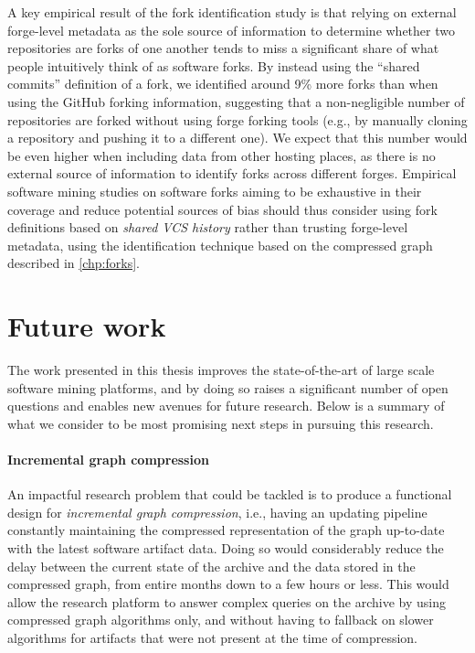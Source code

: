 A key empirical result of the fork identification study is that relying on
external forge-level metadata as the sole source of information to determine
whether two repositories are forks of one another tends to miss a
significant share of what people intuitively think of as software forks.
By instead using the ``shared commits'' definition of a fork, we identified
around 9\% more forks than when using the GitHub forking information,
suggesting that a non-negligible number of repositories are forked without
using forge forking tools (e.g., by manually cloning a repository and pushing
it to a different one). We expect that this number would be even higher when
including data from other hosting places, as there is no external source of
information to identify forks across different forges. Empirical software
mining studies on software forks aiming to be exhaustive in their coverage and
reduce potential sources of bias should thus consider using fork definitions
based on \emph{shared \gls{VCS} history} rather than trusting forge-level
metadata, using the identification technique based on the compressed graph
described in \cref{chp:forks}.

\section{Future work}

The work presented in this thesis improves the state-of-the-art of large scale
software mining platforms, and by doing so raises a significant number of open
questions and enables new avenues for future research. Below is a summary of
what we consider to be most promising next steps in pursuing this research.

\paragraph*{Incremental graph compression}

An impactful research problem that could be tackled is to produce a
functional design for \emph{incremental graph compression}, i.e., having an
updating pipeline constantly maintaining the compressed representation of the
graph up-to-date with the latest software artifact data. Doing so would
considerably reduce the delay between the current state of the archive and the
data stored in the compressed graph, from entire months down to a few hours or
less. This would allow the research platform to answer complex queries on the
archive by using compressed graph algorithms only, and without having to
fallback on slower algorithms for artifacts that were not present at the time
of compression.

